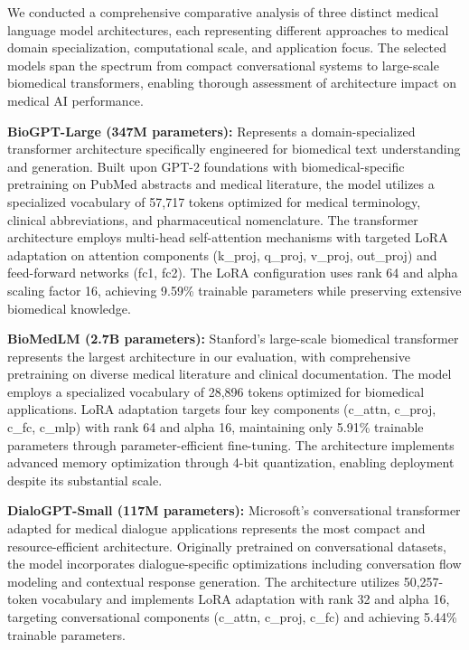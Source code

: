 \documentclass[conference]{IEEEtran}
\begin{document}
We conducted a comprehensive comparative analysis of three distinct medical language model architectures, each representing different approaches to medical domain specialization, computational scale, and application focus. The selected models span the spectrum from compact conversational systems to large-scale biomedical transformers, enabling thorough assessment of architecture impact on medical AI performance.

\textbf{BioGPT-Large (347M parameters):} Represents a domain-specialized transformer architecture specifically engineered for biomedical text understanding and generation. Built upon GPT-2 foundations with biomedical-specific pretraining on PubMed abstracts and medical literature, the model utilizes a specialized vocabulary of 57,717 tokens optimized for medical terminology, clinical abbreviations, and pharmaceutical nomenclature. The transformer architecture employs multi-head self-attention mechanisms with targeted LoRA adaptation on attention components (k\_proj, q\_proj, v\_proj, out\_proj) and feed-forward networks (fc1, fc2). The LoRA configuration uses rank 64 and alpha scaling factor 16, achieving 9.59\% trainable parameters while preserving extensive biomedical knowledge.

\textbf{BioMedLM (2.7B parameters):} Stanford's large-scale biomedical transformer represents the largest architecture in our evaluation, with comprehensive pretraining on diverse medical literature and clinical documentation. The model employs a specialized vocabulary of 28,896 tokens optimized for biomedical applications. LoRA adaptation targets four key components (c\_attn, c\_proj, c\_fc, c\_mlp) with rank 64 and alpha 16, maintaining only 5.91\% trainable parameters through parameter-efficient fine-tuning. The architecture implements advanced memory optimization through 4-bit quantization, enabling deployment despite its substantial scale.

\textbf{DialoGPT-Small (117M parameters):} Microsoft's conversational transformer adapted for medical dialogue applications represents the most compact and resource-efficient architecture. Originally pretrained on conversational datasets, the model incorporates dialogue-specific optimizations including conversation flow modeling and contextual response generation. The architecture utilizes 50,257-token vocabulary and implements LoRA adaptation with rank 32 and alpha 16, targeting conversational components (c\_attn, c\_proj, c\_fc) and achieving 5.44\% trainable parameters.
\end{document}

